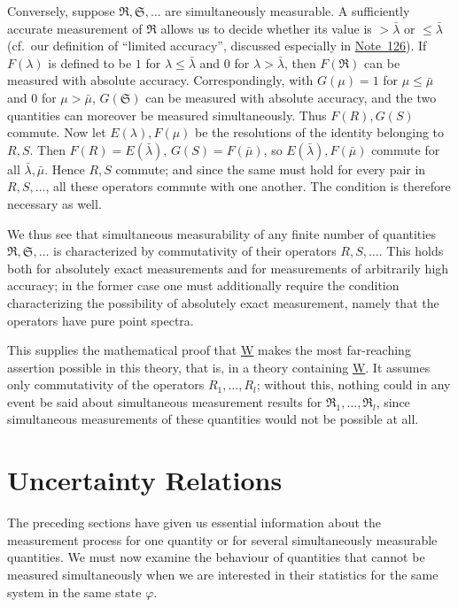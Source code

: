 \documentclass[fontsize=13pt,twoside,openany,headings=normal,parskip=false,bookmarkpackage=false,DIV=calc]{scrbook}
\begin{document}
Conversely, suppose $\mathfrak R,\mathfrak S,\ldots$ are simultaneously measurable. A sufficiently accurate measurement of $\mathfrak R$ allows us to decide whether its value is $>\bar\lambda$ or $\le\bar\lambda$ (cf.\ our definition of ``limited accuracy'', discussed especially in \hyperlink{note-126}{Note~126}). If $F(\lambda)$ is defined to be $1$ for $\lambda\le\bar\lambda$ and $0$ for $\lambda>\bar\lambda$, then $F(\mathfrak R)$ can be measured with absolute accuracy. Correspondingly, with $G(\mu)=1$ for $\mu\le\bar\mu$ and $0$ for $\mu>\bar\mu$, $G(\mathfrak S)$ can be measured with absolute accuracy, and the two quantities can moreover be measured simultaneously. Thus $F(R),G(S)$ commute. Now let
\hypertarget{origpage-121}{}%
$E(\lambda),F(\mu)$ be the resolutions of the identity belonging to $R,S$. Then $F(R)=E(\bar\lambda)$, $G(S)=F(\bar\mu)$, so $E(\bar\lambda),F(\bar\mu)$ commute for all $\bar\lambda,\bar\mu$. Hence $R,S$ commute; and since the same must hold for every pair in $R,S,\ldots$, all these operators commute with one another. The condition is therefore necessary as well.

We thus see that simultaneous measurability of any finite number of quantities $\mathfrak R,\mathfrak S,\ldots$ is characterized by commutativity of their operators $R,S,\ldots$. This holds both for absolutely exact measurements and for measurements of arbitrarily high accuracy; in the former case one must additionally require the condition characterizing the possibility of absolutely exact measurement, namely that the operators have pure point spectra.

This supplies the mathematical proof that \hyperref[post:III.1.W]{W} makes the most far-reaching assertion possible in this theory, that is, in a theory containing \hyperref[post:III.1.W]{W}. It assumes only commutativity of the operators $R_1,\ldots,R_l$; without this, nothing could in any event be said about simultaneous measurement results for $\mathfrak R_1,\ldots,\mathfrak R_l$, since simultaneous measurements of these quantities would not be possible at all.

\section{Uncertainty Relations}\label{sec:III.4}
The preceding sections have given us essential information about the measurement process for one quantity or for several simultaneously measurable quantities. We must now examine the behaviour of quantities that cannot be measured simultaneously when we are interested in their statistics for the same system in the same state $\varphi$.
\end{document}
